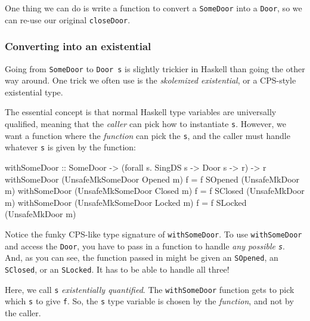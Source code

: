 \documentclass[]{article}
\newenvironment{Shaded}{}{}
\newcommand{\DataTypeTok}[1]{\textcolor[rgb]{0.56,0.13,0.00}{#1}}
\newcommand{\OtherTok}[1]{\textcolor[rgb]{0.00,0.44,0.13}{#1}}
\newcommand{\FunctionTok}[1]{\textcolor[rgb]{0.02,0.16,0.49}{#1}}
\newcommand{\NormalTok}[1]{#1}
\begin{document}
One thing we can do is write a function to convert a \texttt{SomeDoor} into a
\texttt{Door}, so we can re-use our original \texttt{closeDoor}.

\subsubsection{Converting into an
existential}\label{converting-into-an-existential}

Going from \texttt{SomeDoor} to \texttt{Door\ s} is slightly trickier in Haskell
than going the other way around. One trick we often use is the \emph{skolemized
existential}, or a CPS-style existential type.

The essential concept is that normal Haskell type variables are universally
qualified, meaning that the \emph{caller} can pick how to instantiate
\texttt{s}. However, we want a function where the \emph{function} can pick the
\texttt{s}, and the caller must handle whatever \texttt{s} is given by the
function:

\begin{Shaded}
\begin{Highlighting}[]
\OtherTok{withSomeDoor ::} \DataTypeTok{SomeDoor} \OtherTok{->}\NormalTok{ (forall s}\FunctionTok{.} \DataTypeTok{SingDS}\NormalTok{ s }\OtherTok{->} \DataTypeTok{Door}\NormalTok{ s }\OtherTok{->}\NormalTok{ r) }\OtherTok{->}\NormalTok{ r}
\NormalTok{withSomeDoor (}\DataTypeTok{UnsafeMkSomeDoor} \DataTypeTok{Opened}\NormalTok{ m) f }\FunctionTok{=}\NormalTok{ f }\DataTypeTok{SOpened}\NormalTok{ (}\DataTypeTok{UnsafeMkDoor}\NormalTok{ m)}
\NormalTok{withSomeDoor (}\DataTypeTok{UnsafeMkSomeDoor} \DataTypeTok{Closed}\NormalTok{ m) f }\FunctionTok{=}\NormalTok{ f }\DataTypeTok{SClosed}\NormalTok{ (}\DataTypeTok{UnsafeMkDoor}\NormalTok{ m)}
\NormalTok{withSomeDoor (}\DataTypeTok{UnsafeMkSomeDoor} \DataTypeTok{Locked}\NormalTok{ m) f }\FunctionTok{=}\NormalTok{ f }\DataTypeTok{SLocked}\NormalTok{ (}\DataTypeTok{UnsafeMkDoor}\NormalTok{ m)}
\end{Highlighting}
\end{Shaded}

Notice the funky CPS-like type signature of \texttt{withSomeDoor}. To use
\texttt{withSomeDoor} and access the \texttt{Door}, you have to pass in a
function to handle \emph{any possible \texttt{s}}. And, as you can see, the
function passed in might be given an \texttt{SOpened}, an \texttt{SClosed}, or
an \texttt{SLocked}. It has to be able to handle all three!

Here, we call \texttt{s} \emph{existentially quantified}. The
\texttt{withSomeDoor} function gets to pick which \texttt{s} to give \texttt{f}.
So, the \texttt{s} type variable is chosen by the \emph{function}, and not by
the caller.
\end{document}
